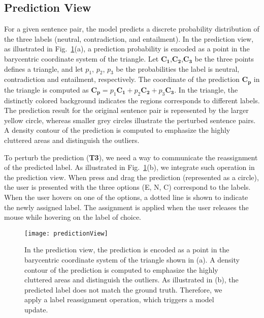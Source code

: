 \subsection{Prediction View}
\label{sec:prediction}
For a given sentence pair, the model predicts a discrete probability distribution of the three labels (neutral, contradiction, and entailment).
%
In the prediction view, as illustrated in Fig.~\ref{fig:predictionView}(a), a prediction probability is encoded as a point in the barycentric coordinate system of the triangle. 
Let $\mathbf{C_1}$,$\mathbf{C_2}$,$\mathbf{C_3}$ be the three points defines a triangle, and let $p_1$, $p_2$, $p_3$ be the probabilities the label is neutral, contradiction and entailment, respectively. The coordinate of the prediction $\mathbf{C_p}$ in the triangle is computed as $\mathbf{C_p} = p_1\mathbf{C_1}+p_2\mathbf{C_2}+p_3\mathbf{C_3}$.
In the triangle, the distinctly colored background indicates the regions corresponds to different labels. The prediction result for the original sentence pair is represented by the larger yellow circle, whereas smaller grey circles illustrate the perturbed sentence pairs. A density contour of the prediction is computed to emphasize the highly cluttered areas and distinguish the outliers.

To perturb the prediction (\textbf{T3}), we need a way to communicate the reassignment of the predicted label. As illustrated in Fig.~\ref{fig:predictionView}(b), we integrate such operation in the prediction view. When press and drag the prediction (represented as a circle), the user is presented with the three options (E, N, C) correspond to the labels. When the user hovers on one of the options, a dotted line is shown to indicate the newly assigned label. The assignment is applied when the user releases the mouse while hovering on the label of choice.

\begin{figure}[htbp]
\centering
\vspace{-2mm}
 \texttt{[image: predictionView]}
 \vspace{-2mm}
 \caption{
In the prediction view, the prediction is encoded as a point in the barycentric coordinate system of the triangle shown in (a).
A density contour of the prediction is computed to emphasize the highly cluttered areas and distinguish the outliers.
As illustrated in (b), the predicted label does not match the ground truth. Therefore, we apply a label reassignment operation, which triggers a model update.
 }
\label{fig:predictionView}
\end{figure}
